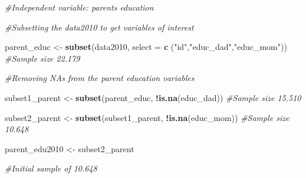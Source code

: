 \documentclass[
]{article}
\newenvironment{Shaded}{\begin{snugshade}}{\end{snugshade}}
\newcommand{\CommentTok}[1]{\textcolor[rgb]{0.56,0.35,0.01}{\textit{#1}}}
\newcommand{\DataTypeTok}[1]{\textcolor[rgb]{0.13,0.29,0.53}{#1}}
\newcommand{\KeywordTok}[1]{\textcolor[rgb]{0.13,0.29,0.53}{\textbf{#1}}}
\newcommand{\NormalTok}[1]{#1}
\newcommand{\OperatorTok}[1]{\textcolor[rgb]{0.81,0.36,0.00}{\textbf{#1}}}
\newcommand{\StringTok}[1]{\textcolor[rgb]{0.31,0.60,0.02}{#1}}
\begin{document}
\begin{Shaded}
\begin{Highlighting}[]
\CommentTok{#Independent variable: parents education}

\CommentTok{#Subsetting the data2010 to get variables of interest }

\NormalTok{parent_educ <-}\StringTok{ }\KeywordTok{subset}\NormalTok{(data2010, }\DataTypeTok{select =} \KeywordTok{c}\NormalTok{ (}\StringTok{"id"}\NormalTok{,}\StringTok{"educ_dad"}\NormalTok{,}\StringTok{"educ_mom"}\NormalTok{)) }
\CommentTok{#Sample size 22.179}

\CommentTok{#Removing NAs from the parent education variables}

\NormalTok{subset1_parent <-}\StringTok{ }\KeywordTok{subset}\NormalTok{(parent_educ, }\OperatorTok{!}\KeywordTok{is.na}\NormalTok{(educ_dad))}
\CommentTok{#Sample size 15.510}

\NormalTok{subset2_parent <-}\StringTok{ }\KeywordTok{subset}\NormalTok{(subset1_parent, }\OperatorTok{!}\KeywordTok{is.na}\NormalTok{(educ_mom))}
\CommentTok{#Sample size 10.648}

\NormalTok{parent_edu2010 <-}\StringTok{ }\NormalTok{subset2_parent}

\CommentTok{#Initial sample of 10.648}
\end{Highlighting}
\end{Shaded}
\end{document}
